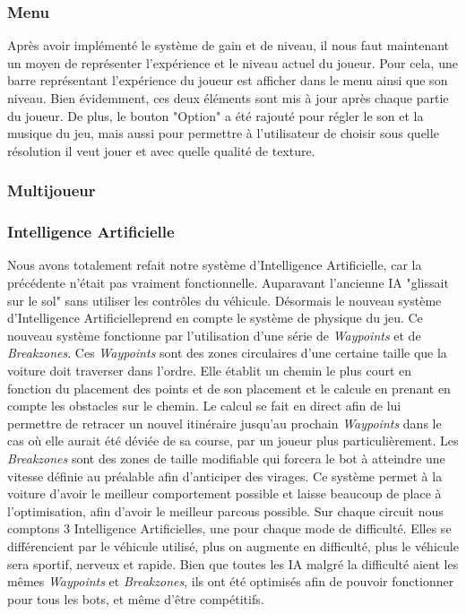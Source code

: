 \documentclass[a4paper,12pt]{article}
\newcommand{\AI}{Intelligence Artificielle}
\begin{document}
            \subsubsection{Menu}
                Après avoir implémenté le système de gain et de niveau, il nous faut maintenant un moyen de représenter
                l'expérience et le niveau actuel du joueur. Pour cela, une barre représentant l'expérience du joueur est
                afficher dans le menu ainsi que son niveau. Bien évidemment, ces deux éléments sont mis à jour après 
                chaque partie du joueur. De plus, le bouton "Option" a été rajouté pour régler le son et la musique du 
                jeu, mais aussi pour permettre à l'utilisateur de choisir sous quelle résolution il veut jouer et avec 
                quelle qualité de texture.  
                
            \subsubsection{Multijoueur}
            \lipsum[33]
            
            \subsubsection{\AI}
            
            Nous avons totalement refait notre système d'\AI, car la précédente n'était pas vraiment fonctionnelle. Auparavant l'ancienne IA "glissait sur le sol" sans utiliser les contrôles du véhicule. Désormais le nouveau système d'\AI prend en compte le système de physique du jeu. Ce nouveau système fonctionne par l'utilisation d'une série de \textsl{Waypoints} et de \textsl{Breakzones}. Ces \textsl{Waypoints} sont des zones circulaires d'une certaine taille que la voiture doit traverser dans l'ordre. Elle établit un chemin le plus court en fonction du placement des points et de son placement et le calcule en prenant en compte les obstacles sur le chemin. Le calcul se fait en direct afin de lui permettre de retracer un nouvel itinéraire jusqu'au prochain \textsl{Waypoints} dans le cas où elle aurait été déviée de sa course, par un joueur plus particulièrement. Les \textsl{Breakzones} sont des zones de taille modifiable qui forcera le bot à atteindre une vitesse définie au préalable afin d'anticiper des virages. Ce système permet à la voiture d'avoir le meilleur comportement possible et laisse beaucoup de place à l'optimisation, afin d'avoir le meilleur parcous possible. Sur chaque circuit nous comptons 3 {\AI}s, une pour chaque mode de difficulté. Elles se différencient par le véhicule utilisé, plus on augmente en difficulté, plus le véhicule sera sportif, nerveux et rapide. Bien que toutes les IA malgré la difficulté aient les mêmes \textsl{Waypoints} et \textsl{Breakzones}, ils ont été optimisés afin de pouvoir fonctionner pour tous les bots, et même d'être compétitifs.
            
\end{document}
